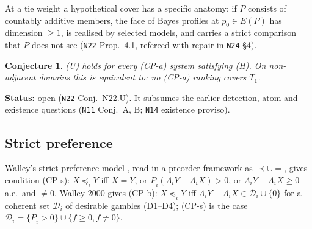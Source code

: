 \documentclass[11pt]{article}
\newtheorem{conjecture}[theorem]{Conjecture}
\theoremstyle{definition}
\theoremstyle{remark}
\newcommand{\lp}{\underline{P}}
\newcommand{\src}[1]{\texttt{#1}}
\newcommand{\status}[1]{\par\smallskip\noindent\textbf{Status:} #1\par\smallskip}
\begin{document}
At a tie weight a hypothetical cover has a specific anatomy: if $P$ consists of countably additive members, the face of Bayes profiles at $p_0\in E(P)$ has dimension $\ge1$, is realised by selected models, and carries a strict comparison that $P$ does not see (\src{N22} Prop.~4.1, refereed with repair in \src{N24} \S4).

\begin{conjecture}\label{conj:U}
(U) holds for every (CP-a) system satisfying (H). On non-adjacent domains this is equivalent to: no (CP-a) ranking covers $T_1$.
\end{conjecture}
\status{open (\src{N22} Conj.~N22.U). It subsumes the earlier detection, atom and existence questions (\src{N11} Conj.~A, B; \src{N14} existence proviso).}

\subsection{Strict preference}
Walley's strict-preference model \cite[\S\S3.7.7--3.7.9]{W1991}, read in a preorder framework as $\prec\cup{=}$, gives condition (CP-s): $X\preceq_iY$ iff $X=Y$, or $\lp_i(\Lambda_iY-\Lambda_iX)>0$, or $\Lambda_iY-\Lambda_iX\ge0$ a.e.\ and $\ne0$. Walley 2000 \cite[\S6]{W2000} gives (CP-b): $X\preceq_iY$ iff $\Lambda_iY-\Lambda_iX\in\mathcal D_i\cup\{0\}$ for a coherent set $\mathcal D_i$ of desirable gambles (D1--D4); (CP-s) is the case $\mathcal D_i=\{\lp_i>0\}\cup\{f\ge0,f\ne0\}$.
\end{document}
